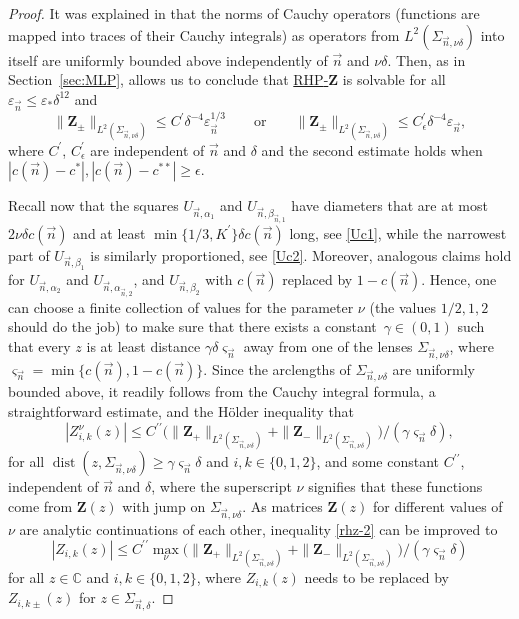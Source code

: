 \documentclass[10pt,a4paper]{amsart}
\numberwithin{equation}{section}
\newcommand{\C}		{\mathbb{C}}
\newcommand{\dist}{\operatorname{dist}}
\newcommand{\n}{{\vec n}}
\newcommand{\rhz} {\textnormal{RHP}-${\boldsymbol Z}$}
\begin{document}
\begin{proof}
It was explained in \cite[Lemma~7.9]{ApDenYa21} that the norms of Cauchy operators (functions are mapped into traces of their Cauchy integrals) as operators from $ L^2(\Sigma_{\n,\nu\delta}) $ into itself are uniformly bounded above independently of $ \n $ and $ \nu\delta $. Then, as in Section~\ref{sec:MLP}, \cite[Theorem~8.1]{FokasItsKapaevNovokshenov} allows us to conclude that \hyperref[rhz]{\rhz} is solvable for all $ \varepsilon_\n \leq \varepsilon_*\delta^{12} $ and
\begin{equation}
\label{rhz-4}
\|\boldsymbol Z_\pm\|_{L^2(\Sigma_{\n,\nu\delta})} \leq C^\prime \delta^{-4} \varepsilon_\n^{1/3} \qquad \text{or} \qquad \|\boldsymbol Z_\pm\|_{L^2(\Sigma_{\n,\nu\delta})} \leq C^\prime_\epsilon \delta^{-4}\varepsilon_\n,
\end{equation}
where $ C^\prime$, $C^\prime_\epsilon $ are independent of $ \n $ and $ \delta $ and the second estimate holds when $ |c(\n)-c^\ast|,|c(\n)-c^{\ast\ast}|\geq\epsilon $.

Recall now that the squares $ U_{\n,\alpha_1} $ and $ U_{\n,\beta_{\n,1}} $ have diameters that are at most $ 2\nu\delta c(\n) $ and at least $ \min\{1/3,K^\prime\}\delta c(\n)$ long, see \eqref{Uc1}, while the narrowest part of $ U_{\n,\beta_1} $ is similarly proportioned, see \eqref{Uc2}. Moreover, analogous claims hold for $ U_{\n,\alpha_2} $ and $ U_{\n,\alpha_{\n,2}} $, and $ U_{\n,\beta_2} $ with $ c(\n) $ replaced by $ 1-c(\n) $. Hence, one can choose a finite collection of values for the parameter $ \nu $ (the values $1/2,1,2$ should do the job) to make sure that there exists a constant~$ \gamma\in(0,1)$ such that every $ z $ is at least distance $ \gamma\delta \varsigma_\n $ away from one of the lenses $ \Sigma_{\n,\nu\delta} $, where~$ {\varsigma_\n = \min\{ c(\n),1-c(\n) \} }$. Since the arclengths of $ \Sigma_{\n,\nu\delta} $ are uniformly bounded above, it readily follows from the Cauchy integral formula, a straightforward estimate, and the H\"older inequality that
\begin{equation}
\label{rhz-2}
|Z_{i,k}^\nu(z)| \leq C^{\prime\prime} \bigl( \|\boldsymbol Z_+\|_{L^2(\Sigma_{\n,\nu\delta})} + \|\boldsymbol Z_-\|_{L^2(\Sigma_{\n,\nu\delta})} \bigr) / (\gamma \varsigma_\n\delta ),
\end{equation}
for all $ \dist(z,\Sigma_{\n,\nu\delta}) \geq \gamma\varsigma_\n\delta $ and $ i,k\in\{0,1,2\} $, and some constant $ C^{\prime\prime} $, independent of $ \n $ and $ \delta $, where the superscript $ \nu $ signifies that these functions come from $ \boldsymbol Z(z) $ with jump on $ \Sigma_{\n,\nu\delta} $. As matrices $ \boldsymbol{Z}(z) $ for different values of $ \nu $ are analytic continuations of each other, inequality \eqref{rhz-2} can be improved to
\begin{equation}
\label{rhz-3}
|Z_{i,k}(z)| \leq C^{\prime\prime} \max_\nu \bigl( \|\boldsymbol Z_+\|_{L^2(\Sigma_{\n,\nu\delta})} + \|\boldsymbol Z_-\|_{L^2(\Sigma_{\n,\nu\delta})} \bigr) / (\gamma \varsigma_\n\delta)
\end{equation}
for all $ z\in\C $ and $ i,k\in\{0,1,2\} $, where $ Z_{i,k}(z) $ needs to be replaced by $ Z_{i,k\pm}(z) $ for $ z\in\Sigma_{\n,\delta} $.


\end{proof}
\end{document}
